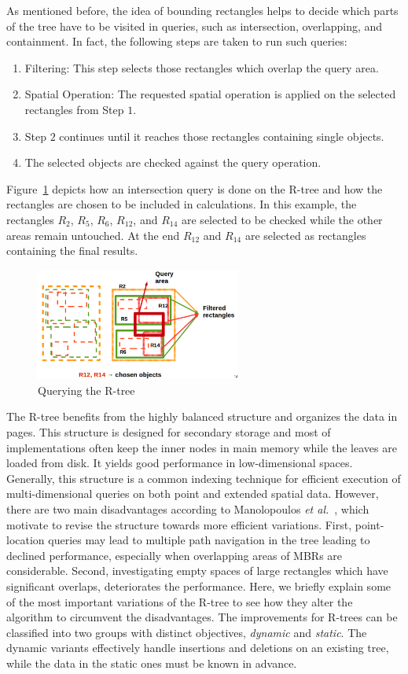 \documentclass[a4paper,12pt]{article}
\begin{document}
As mentioned before, the idea of bounding rectangles helps to decide which parts of the tree have to be visited in queries, such as intersection, overlapping, and containment. In fact, the following steps are taken to run such queries:
\begin{enumerate}
\item Filtering: This step selects those rectangles which overlap the query area.
\item Spatial Operation: The requested spatial operation is applied on the selected rectangles from Step $1$. 
\item Step $2$ continues until it reaches those rectangles containing single objects. 
\item The selected objects are checked against the query operation. 
\end{enumerate}
Figure~\ref{rtreequery} depicts how an intersection query is done on the R-tree and how the rectangles are chosen to be included in calculations. In this example, the rectangles $R_2$, $R_5$, $R_6$, $R_{12}$, and $R_{14}$ are selected to be checked while the other areas remain untouched. At the end $R_{12}$ and $R_{14}$ are selected as rectangles containing the final results.

\begin{figure}
\centering
\includegraphics[width=0.6\textwidth,height=0.2\textheight]{Rtree-query}
\caption{Querying the R-tree}
\label{rtreequery}
\end{figure}

The R-tree benefits from the highly balanced structure and organizes the data in pages. This structure is designed for secondary storage and most of implementations often keep the inner nodes in main memory while the leaves are loaded from disk. It yields good performance in low-dimensional spaces. Generally, this structure is a common indexing technique for efficient execution of multi-dimensional queries on both point and extended spatial data. However, there are two main disadvantages according to Manolopoulos \emph{et al.}~\cite{Manolopoulos:2005}, which motivate to revise the structure towards more efficient variations. First, point-location queries may lead to multiple path navigation in the tree leading to declined performance, especially when overlapping areas of MBRs are considerable. Second, investigating empty spaces of large rectangles which have significant overlaps, deteriorates the performance. Here, we briefly explain some of the most important variations of the R-tree to see how they alter the algorithm to circumvent the disadvantages. The improvements for R-trees can be classified into two groups with distinct objectives, \textit{dynamic} and \textit{static}. The dynamic variants effectively handle insertions and deletions on an existing tree, while the data in the static ones must be known in advance. 
\end{document}
